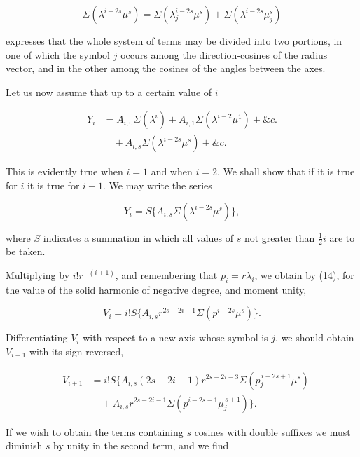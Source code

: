 \documentclass[11pt,a4paper]{article}
\begin{document}
\begin{equation}\tag{16}
\Sigma(\lambda^{i-2s}\mu^s)=\Sigma(\lambda_j^{i-2s}\mu^s)+\Sigma(\lambda^{i-2s}\mu_j^s)
\end{equation}

expresses that the whole system of terms may be divided into two portions, in one of which the symbol $j$ occurs among the direction-cosines of the radius vector, and in the other among the cosines of the angles between the axes.

Let us now assume that up to a certain value of $i$

\begin{equation}\tag{17}
\begin{split}
Y_i&=A_{i,0}\Sigma(\lambda^i)+A_{i,1}\Sigma(\lambda^{i-2}\mu^1)+\&c.\\
&\quad +A_{i,s}\Sigma(\lambda^{i-2s}\mu^s)+\&c.
\end{split}
\end{equation}

This is evidently true when $i=1$ and when $i=2$. We shall show that if it is true for $i$ it is true for $i+1$. We may write the series

\begin{equation}\tag{18}
Y_i=S\{A_{i,s}\Sigma(\lambda^{i-2s}\mu^s)\},
\end{equation}

where $S$ indicates a summation in which all values of $s$ not greater than $\frac{1}{2}i$ are to be taken.

Multiplying by $i!r^{-(i+1)}$, and remembering that $p_i=r\lambda_i$, we obtain by (14), for the value of the solid harmonic of negative degree, and moment unity,

\begin{equation}\tag{19}
V_i=i!S\{A_{i,s}r^{2s-2i-1}\Sigma(p^{i-2s}\mu^s)\}.
\end{equation}

Differentiating $V_i$ with respect to a new axis whose symbol is $j$, we should obtain $V_{i+1}$ with its sign reversed,

\begin{equation}\tag{20}
\begin{split}
-V_{i+1}&=i!S\{A_{i,s}(2s-2i-1)r^{2s-2i-3}\Sigma(p_j^{\,i-2s+1}\mu^s)\\
&\quad +A_{i,s}r^{2s-2i-1}\Sigma(p^{i-2s-1}\mu_j^{\,s+1})\}.
\end{split}
\end{equation}

If we wish to obtain the terms containing $s$ cosines with double suffixes we must diminish $s$ by unity in the second term, and we find
\end{document}
